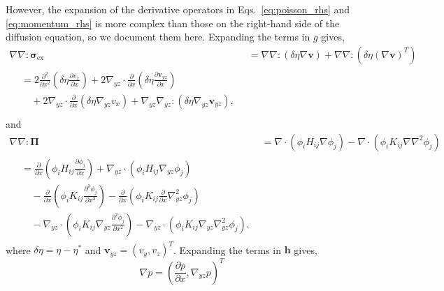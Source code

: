\documentclass[journal=mamobx,manuscript=suppinfo]{achemso}
\newcommand{\ex}{\mathrm{ex}}
\begin{document}
However, the expansion of the derivative operators in Eqs.~\ref{eq:poisson_rhs} and \ref{eq:momentum_rhs} is more complex than those on the right-hand side of the diffusion equation, so we document them here.
Expanding the terms in $g$ gives,
\begin{align}
  \nabla \nabla : \bm{\sigma}_{\ex} 
    & = \nabla\nabla : (\delta \eta \nabla \bm{v}) + 
      \nabla\nabla : (\delta \eta (\nabla \bm{v})^{T}) \\
    \begin{split}
    & = 2 \frac{\partial^{2}}{\partial x^{2}} \left ( \delta \eta \frac{\partial v_{x}}{\partial x} \right ) 
      + 2 \nabla_{yz} \cdot \frac{\partial}{\partial x} \left ( \delta \eta \frac{\partial \bm{v}_{yz}}{\partial x} \right ) \\
    & \quad + 2 \nabla_{yz} \cdot \frac{\partial}{\partial x} \left ( \delta \eta \nabla_{yz} {v}_{x} \right )
      + \nabla_{yz} \nabla_{yz} : \left ( \delta \eta \nabla_{yz} \bm{v}_{yz} \right )  \textrm{, } \\ 
    \end{split}
\end{align}
and
\begin{align}
  \nabla \nabla : \bm{\Pi}
    & = \nabla \cdot \left ( \phi_{i} H_{ij} \nabla \phi_{j} \right )
      - \nabla \cdot \left ( \phi_{i} K_{ij} \nabla \nabla^{2} \phi_{j} \right ) \\
    \begin{split}
    & = \frac{\partial}{\partial x} \left ( \phi_{i} H_{ij} \frac{\partial \phi_{j}}{\partial x} \right ) 
       + \nabla_{yz} \cdot \left ( \phi_{i} H_{ij} \nabla_{yz} \phi_{j} \right ) \\
    &\quad  - \frac{\partial}{\partial x} \left ( \phi_{i} K_{ij} \frac{\partial^{3} \phi_{j} }{\partial x^{3}} \right ) 
            - \frac{\partial}{\partial x} \left ( \phi_{i} K_{ij} \frac{\partial}{\partial x} \nabla_{yz}^{2} \phi_{j} \right ) \\
    &\quad  - \nabla_{yz} \cdot \left ( \phi_{i} K_{ij} \nabla_{yz} \frac{\partial^{2} \phi_{j} }{\partial x^{2}} \right )
            - \nabla_{yz} \cdot \left ( \phi_{i} K_{ij} \nabla_{yz} \nabla_{yz}^{2} \phi_{j} \right ) \textrm{.}
      \end{split}
\end{align}
where $\delta \eta = \eta - \eta^{*}$ and $\bm{v}_{yz} = \left ( v_{y}, v_{z} \right )^{T}$.
Expanding the terms in $\bm{h}$ gives,
\begin{equation}
  \nabla p = \left ( \frac{\partial p}{\partial x}, \nabla_{yz} p \right )^{T}
\end{equation}
\end{document}
